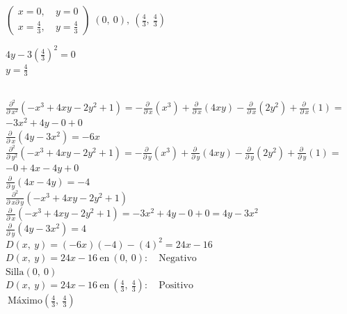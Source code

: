 \documentclass[13pt]{memoir}
\begin{document}
\begin{enumerate}
\begin{minipage}[t]{0.5\textwidth}
$\begin{pmatrix}x=0,\:&y=0\\ x=\frac{4}{3},\:&y=\frac{4}{3}\end{pmatrix} \; \left(0,\:0\right),\:\left(\frac{4}{3},\:\frac{4}{3}\right)$\\
\end{minipage}%
\hfill
\begin{minipage}[t]{0.5\textwidth} 
$4y-3\left(\frac{4}{3}\right)^2=0$\\
$y=\frac{4}{3}$\\
\end{minipage}\\

$\frac{\partial ^2}{\partial \:x^2}\left(-x^3+4xy-2y^2+1\right) = -\frac{\partial \:}{\partial \:x}\left(x^3\right)+\frac{\partial \:}{\partial \:x}\left(4xy\right)-\frac{\partial \:}{\partial \:x}\left(2y^2\right)+\frac{\partial \:}{\partial \:x}\left(1\right)=$\\
$-3x^2+4y-0+0$\\
$\frac{\partial \:}{\partial \:x}\left(4y-3x^2\right) =-6x$\\

$\frac{\partial ^2}{\partial \:y^2}\left(-x^3+4xy-2y^2+1\right) =-\frac{\partial \:}{\partial \:y}\left(x^3\right)+\frac{\partial \:}{\partial \:y}\left(4xy\right)-\frac{\partial \:}{\partial \:y}\left(2y^2\right)+\frac{\partial \:}{\partial \:y}\left(1\right)=$\\
$-0+4x-4y+0$\\
$\frac{\partial \:}{\partial \:y}\left(4x-4y\right)=-4$\\

$\frac{\partial ^2}{\partial \:x\partial \:y}\left(-x^3+4xy-2y^2+1\right)$\\
$\frac{\partial \:}{\partial \:x}\left(-x^3+4xy-2y^2+1\right) =-3x^2+4y-0+0 = 4y-3x^2$\\
$\frac{\partial \:}{\partial \:y}\left(4y-3x^2\right)=4$\\

$D\left(x,\:y\right)=\left(-6x\right)\left(-4\right)-\left(4\right)^2 = 24x-16$\\
$D\left(x,\:y\right)=24x-16\mathrm{\:en\:}\left(0,\:0\right):\quad \mathrm{Negativo}$\\
$\mathrm{Silla}\left(0,\:0\right)$\\
$D\left(x,\:y\right)=24x-16\mathrm{\:en\:}\left(\frac{4}{3},\:\frac{4}{3}\right):\quad \mathrm{Positivo}$\\
$\:\mathrm{Máximo}\left(\frac{4}{3},\:\frac{4}{3}\right)$\\


\end{enumerate}
\end{document}

